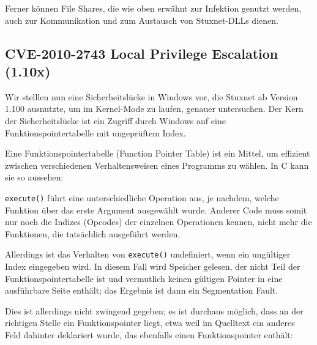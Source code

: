 \documentclass[a4paper]{article}
\begin{document}
Ferner können File Shares, die wie oben erwähnt zur Infektion genutzt werden,
auch zur Kommunikation und zum Austausch von Stuxnet-DLLs dienen.

\subsection{CVE-2010-2743 Local Privilege Escalation (1.10x)}

Wir stelllen nun eine Sicherheitslücke in Windows vor, die Stuxnet ab Version 1.100 ausnutzte, um im Kernel-Mode zu laufen, genauer untersuchen.
Der Kern der Sicherheitslücke ist ein Zugriff durch Windows auf eine Funktionspointertabelle mit ungeprüftem Index.

Eine Funktionspointertabelle (Function Pointer Table) ist ein Mittel,
um effizient zwischen verschiedenen Verhaltensweisen eines Programms zu wählen.
In C kann sie so aussehen:



\texttt{execute()} führt eine unterschiedliche Operation aus, je nachdem, welche Funktion über das erste Argument ausgewählt wurde.
Anderer Code muss somit nur noch die Indizes (Opcodes) der einzelnen Operationen kennen, nicht mehr die Funktionen, die tatsächlich ausgeführt werden.

Allerdings ist das Verhalten von \texttt{execute()} undefiniert, wenn ein ungültiger Index eingegeben wird.
In diesem Fall wird Speicher gelesen, der nicht Teil der Funktionspointertabelle ist und vermutlich keinen gültigen Pointer in eine ausführbare Seite enthält;
das Ergebnis ist dann ein Segmentation Fault.



Dies ist allerdings nicht zwingend gegeben; es ist durchaus möglich, dass an der richtigen Stelle ein Funktionspointer liegt,
etwa weil im Quelltext ein anderes Feld dahinter deklariert wurde, das ebenfalls einen Funktionspointer enthält:


\end{document}
